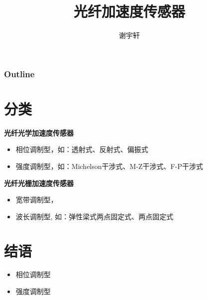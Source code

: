 \documentclass[notheorems, aspectratio=54]{beamer}
\title[光纤加速度传感器]{光纤加速度传感器}
\author{谢宇轩}
\institute[HIT]{yuxuan.xie@hotmail.com}
\date{}
\begin{document}
\begin{frame}
  \titlepage
\end{frame}

\begin{frame}
  \frametitle{Outline}
  \tableofcontents
\end{frame}

\section{分类}
\begin{frame}

\textbf{光纤光学加速度传感器}
    \begin{itemize}
        \setlength\itemsep{1em}
        \item 相位调制型，如：透射式、反射式、偏振式
        \item 强度调制型，如：Michelson干涉式、M-Z干涉式、F-P干涉式
    \end{itemize}
\textbf{光纤光栅加速度传感器}
    \begin{itemize} 
        \setlength\itemsep{1em}
        \item 宽带调制型，
        \item 波长调制型, 如：弹性梁式两点固定式、两点固定式
    \end{itemize}

\end{frame}

\begin{frame}
\end{frame}


\section{结语}
\begin{frame}
    \begin{itemize}
        \setlength\itemsep{1em}
        \item 相位调制型
        \item 强度调制型
    \end{itemize}

\end{frame}
\end{document}
